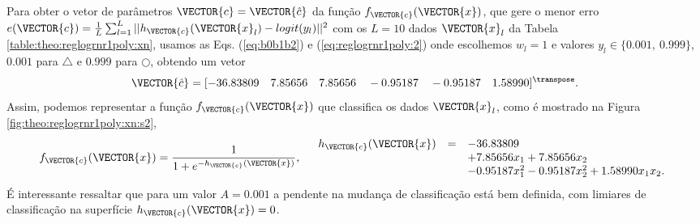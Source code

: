 \begin{SolutionT}\label{sol:theo:reglogrnr1poly:s2}
Para obter o vetor de parâmetros $\VECTOR{c}=\VECTOR{\hat{c}}$ da função $f_{\VECTOR{c}}(\VECTOR{x})$, 
que gere o menor erro $e(\VECTOR{c}) = \frac{1}{L} \sum_{l=1}^{L} ||h_{\VECTOR{c}}(\VECTOR{x}_l)-logit(y_l)||^2$
com os $L=10$ dados $\VECTOR{x}_l$ da Tabela \ref{table:theo:reglogrnr1poly:xn},
usamos as Eqs. (\ref{eq:b0b1b2}) e  (\ref{eq:reglogrnr1poly:2}) 
onde escolhemos $w_l=1$ e valores $y_l \in \{0.001,~ 0.999\}$,
$0.001$ para $\bigtriangleup$ e $0.999$ para $\bigcirc$, 
obtendo um vetor 
\begin{equation}
\VECTOR{\hat{c}}=[-36.83809\quad 7.85656\quad 7.85656\quad -0.95187\quad -0.95187\quad 1.58990]^{\transpose}.                  
\end{equation}
Assim, podemos representar a função $f_{\VECTOR{c}}(\VECTOR{x})$ que classifica os dados $\VECTOR{x}_l$, 
como é mostrado na Figura \ref{fig:theo:reglogrnr1poly:xn:s2},
\begin{equation}
f_{\VECTOR{c}}(\VECTOR{x})= \frac{1}{1+e^{-h_{\VECTOR{c}}(\VECTOR{x})}},
\quad
\begin{array}{lll}
h_{\VECTOR{c}}(\VECTOR{x}) & = & -36.83809\\
                         ~ & ~ & +7.85656 x_1 +7.85656 x_2 \\
                         ~ & ~ & -0.95187 x_1^2 -0.95187  x_2^2 + 1.58990 x_1 x_2.\\
\end{array}
\end{equation}
É interessante ressaltar que para um valor $A=0.001$ a pendente na mudança de classificação está bem definida,
com limiares de classificação na superfície $h_{\VECTOR{c}}(\VECTOR{x})=0$.
\end{SolutionT}
